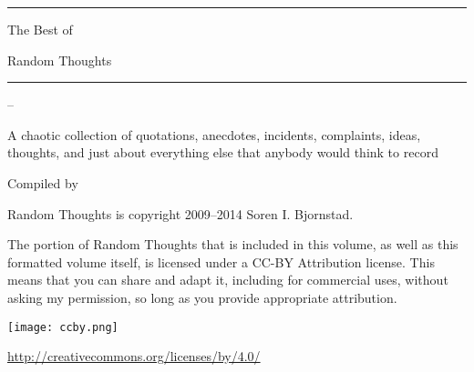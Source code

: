\documentclass[10pt]{memoir}
\begin{document}
\thispagestyle{empty}

\vspace*{8em}
\begin{center}
\hrule\vskip 5pt
{\HUGE
The Best of
\vskip 10pt

Random Thoughts
}
\vskip 4pt
\hrule
\vskip 15pt

{\LARGE {}\thinspace--\thinspace{}}
\end{center}

\vspace*{3em}

{\itshape
  \setlength\leftskip{0pt}
  \setlength\rightskip{0pt}
  \setlength\parfillskip{0pt}
  \setlength\parindent{0pt}

  A chaotic collection of quotations, anecdotes, incidents, complaints, ideas, thoughts, and just about everything else that anybody would think to record
}

\vspace{16em}

\begin{center}
{\Large Compiled by}
\vskip 5pt
{\Huge {}}
\vskip 2pt
\end{center}

\clearpage

\thispagestyle{empty}

\vspace*{9em}
  {
    \noindent Random Thoughts is copyright 2009--2014 Soren I. Bjornstad.

    \vspace*{1em}

    \noindent The portion of Random Thoughts that is included in this volume, as well as this formatted volume itself, is licensed under a CC-BY  Attribution license. This means that you can share and adapt it, including for commercial uses, without asking my permission, so long as you provide appropriate attribution.

    \vspace*{0.5em}

    \begin{center}
    \texttt{[image: ccby.png]}

    \url{http://creativecommons.org/licenses/by/4.0/}
    \end{center}
  }

  \vspace{0.5em}
\end{document}
